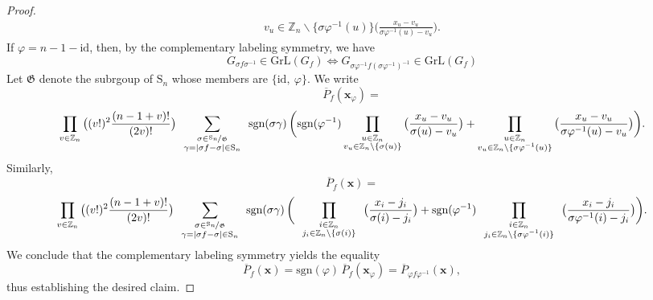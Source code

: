 \begin{proof}
\begin{align*}
{{v_{u}\in\mathbb{Z}_{n}\backslash\{\sigma\varphi^{-1}(u)\}
}
}\bigg(\frac{x_{u}-v_{u}}{\sigma\varphi^{-1}(u)-v_{u}}\bigg).
\end{align*}
If $\varphi=n-1-\text{id}$, then,
by the complementary labeling symmetry, we have 
\[
G_{\sigma f\sigma^{-1}}\in\text{GrL}\left(G_{f}\right)\Longleftrightarrow G_{\sigma\varphi^{-1}f(\sigma\varphi^{-1})^{-1}}\in\text{GrL}\left(G_{f}\right)
\]
Let $\mathfrak{G}$ denote the subrgoup of $\text{S}_n$ whose members are $\big\{\text{id},\ \varphi\big\}$. We write
\[
\overline{P}_f(\mathbf{x}_\varphi)=
\]
\[
\prod_{v\in\mathbb{Z}_{n}}\big((v!)^{2}\frac{(n-1+v)!}{(2v)!}\big)\sum_{\begin{array}{c}
\substack{\sigma\in\nicefrac{\text{S}_{n}}{\mathfrak{G}}\\
\gamma=\left|\sigma f-\sigma\right|\in\text{S}_{n}
}
\end{array}}\text{sgn}(\sigma\gamma)\,\bigg(\text{sgn}(\varphi^{-1})\prod_{\substack{u\in\mathbb{Z}_{n}\\
v_{u}\in\mathbb{Z}_{n}\backslash\{\sigma(u)\}
}
}\big(\frac{x_{u}-v_{u}}{\sigma(u)-v_{u}}\big)+\prod_{\substack{u\in\mathbb{Z}_{n}\\
v_{u}\in\mathbb{Z}_{n}\backslash\{\sigma\varphi^{-1}(u)\}
}
}\big(\frac{x_{u}-v_{u}}{\sigma\varphi^{-1}(u)-v_{u}}\big)\bigg).
\]
Similarly, 
\[
\overline{P}_f(\mathbf{x})=
\]
\[
\prod_{v\in\mathbb{Z}_{n}}\big((v!)^{2}\frac{(n-1+v)!}{(2v)!}\big)\sum_{\begin{array}{c}
\substack{\sigma\in\nicefrac{\text{S}_{n}}{\mathfrak{G}}\\
\gamma=\left|\sigma f-\sigma\right|\in\text{S}_{n}
}
\end{array}}\text{sgn}(\sigma\gamma)\,\bigg(\prod_{\begin{array}{c}
\substack{i\in\mathbb{Z}_{n}\\
j_{i}\in\mathbb{Z}_{n}\backslash\{\sigma(i)\}
}
\end{array}}\big(\frac{x_{i}-j_{i}}{\sigma(i)-j_{i}}\big)+\text{sgn}(\varphi^{-1})\prod_{\begin{array}{c}
\substack{i\in\mathbb{Z}_{n}\\
j_{i}\in\mathbb{Z}_{n}\backslash\{\sigma\varphi^{-1}(i)\}
}
\end{array}}\big(\frac{x_{i}-j_{i}}{\sigma\varphi^{-1}(i)-j_{i}}\big)\bigg).
\]
We conclude that the complementary labeling symmetry yields the equality
\[
\overline{P}_f(\mathbf{x})=\text{sgn}(\varphi)\,\overline{P}_f(\mathbf{x}_{\varphi})=\overline{P}_{\varphi f\varphi^{-1}}(\mathbf{x}),
\]
thus establishing the desired claim.
\end{proof}

